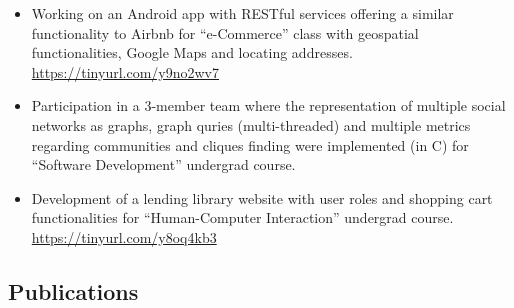 \documentclass[a4paper,oneside,10pt]{article}
\begin{document}
\begin{itemize}
\begin{sloppypar}
\end{sloppypar}

\item Working on an Android app with RESTful services offering a similar functionality to Airbnb for ``e-Commerce'' class with geospatial functionalities, Google Maps and locating addresses. \url{https://tinyurl.com/y9no2wv7}

\item Participation in a 3-member team where the representation of multiple social networks as graphs, graph quries (multi-threaded) and multiple metrics regarding communities and cliques finding were implemented (in C) for ``Software Development'' undergrad course.

\item Development of a lending library website with user roles and shopping cart functionalities for ``Human-Computer Interaction'' undergrad course. \url{https://tinyurl.com/y8oq4kb3}

\end{itemize}

\subsection*{Publications}
\end{document}
